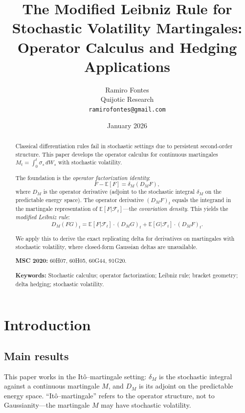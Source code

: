 \documentclass[11pt]{article}
\title{The Modified Leibniz Rule for Stochastic Volatility Martingales:\\[0.3em]
Operator Calculus and Hedging Applications}
\author{Ramiro Fontes\\[0.5em]
\small Quijotic Research\\[0.3em]
\small\texttt{ramirofontes@gmail.com}}
\date{January 2026}
\theoremstyle{plain}
\theoremstyle{definition}
\theoremstyle{remark}
\newcommand{\E}{\mathbb{E}}
\newcommand{\F}{\mathcal{F}}
\begin{document}
\maketitle

\begin{abstract}
Classical differentiation rules fail in stochastic settings due to persistent 
second-order structure. This paper develops the operator calculus for continuous 
martingales $M_t = \int_0^t \sigma_s\,dW_s$ with stochastic volatility.

The foundation is the \emph{operator factorization identity}:
\[
F - \E[F] = \delta_M(D_M F),
\]
where $D_M$ is the operator derivative (adjoint to the stochastic integral 
$\delta_M$ on the predictable energy space). The operator derivative $(D_M F)_t$ 
equals the integrand in the martingale representation of $\E[F|\F_t]$---the 
\emph{covariation density}. This yields the \emph{modified Leibniz rule}:
\[
D_M(FG)_t = \E[F|\F_t] \cdot (D_M G)_t + \E[G|\F_t] \cdot (D_M F)_t.
\]

We apply this to derive the exact replicating delta for derivatives on 
martingales with stochastic volatility, where closed-form Gaussian deltas 
are unavailable.

\medskip
\noindent\textbf{MSC 2020:} 60H07, 60H05, 60G44, 91G20.

\noindent\textbf{Keywords:} Stochastic calculus; operator factorization; Leibniz rule; 
bracket geometry; delta hedging; stochastic volatility.
\end{abstract}

\section{Introduction}\label{sec:intro}

\subsection{Main results}

This paper works in the It\^o--martingale setting: $\delta_M$ is the stochastic 
integral against a continuous martingale $M$, and $D_M$ is its adjoint on the 
predictable energy space. ``It\^o--martingale'' refers to the operator structure, 
not to Gaussianity---the martingale $M$ may have stochastic volatility.
\end{document}
